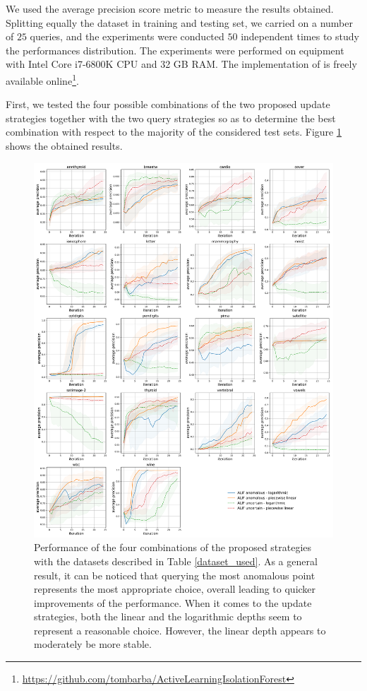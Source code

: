 

We used the average precision score metric to measure the results obtained. Splitting equally the dataset in training and testing set, we carried on a number of $25$ queries, and the experiments were conducted $50$ independent times to study the performances distribution. 
The experiments were performed on equipment with Intel Core i7-6800K CPU and 32 GB RAM. The implementation of \approach is freely available online\footnote{\url{https://github.com/tombarba/ActiveLearningIsolationForest} }. 

First, we tested the four possible combinations of the two proposed update strategies together with the two query strategies so as to determine the best combination with respect to the majority of the considered test sets. Figure \ref{risultati_1} shows the obtained results.

\begin{figure}
   \centering
    \includegraphics[width=\textwidth]{four_strategies.pdf}
    \caption{Performance of the four combinations of the proposed strategies with the datasets described in Table \ref{dataset_used}. As a general result, it can be noticed that querying the most anomalous point represents the most appropriate choice, overall leading to quicker improvements of the performance. When it comes to the update strategies, both the linear and the logarithmic depths seem to represent a reasonable choice. However, the linear depth appears to moderately be more stable.}
    \label{risultati_1}
\end{figure}

